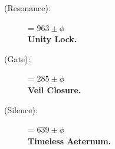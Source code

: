 \begin{description}
    \item[\ZHEK{} (Resonance):] \zhekumel = $963\pm\phi$\, \\
    \textbf{Unity Lock.}

    \item[\SHAV{} (Gate):] \shavhinge = $285\pm\phi$\, \\
    \textbf{Veil Closure.}

    \item[\TRIG{} (Silence):] \trigetern = $639\pm\phi$\, \\
    \textbf{Timeless Aeternum.}
\end{description}

